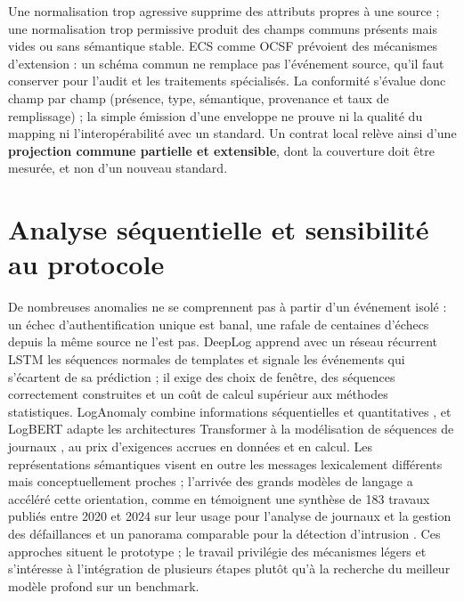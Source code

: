 Une normalisation trop agressive supprime des attributs propres à une source ; une normalisation trop permissive produit des champs communs présents mais vides ou sans sémantique stable. ECS comme OCSF prévoient des mécanismes d'extension : un schéma commun ne remplace pas l'événement source, qu'il faut conserver pour l'audit et les traitements spécialisés. La conformité s'évalue donc champ par champ (présence, type, sémantique, provenance et taux de remplissage) ; la simple émission d'une enveloppe ne prouve ni la qualité du mapping ni l'interopérabilité avec un standard. Un contrat local relève ainsi d'une \textbf{projection commune partielle et extensible}, dont la couverture doit être mesurée, et non d'un nouveau standard.

\section{Analyse séquentielle et sensibilité au protocole}

De nombreuses anomalies ne se comprennent pas à partir d'un événement isolé : un échec d'authentification unique est banal, une rafale de centaines d'échecs depuis la même source ne l'est pas. DeepLog apprend avec un réseau récurrent LSTM les séquences normales de templates et signale les événements qui s'écartent de sa prédiction \cite{du2017deeplog} ; il exige des choix de fenêtre, des séquences correctement construites et un coût de calcul supérieur aux méthodes statistiques. LogAnomaly combine informations séquentielles et quantitatives \cite{meng2019loganomaly}, et LogBERT adapte les architectures Transformer à la modélisation de séquences de journaux \cite{guo2021logbert}, au prix d'exigences accrues en données et en calcul. Les représentations sémantiques visent en outre les messages lexicalement différents mais conceptuellement proches ; l'arrivée des grands modèles de langage a accéléré cette orientation, comme en témoignent une synthèse de 183 travaux publiés entre 2020 et 2024 sur leur usage pour l'analyse de journaux et la gestion des défaillances \cite{zhang2025aiops} et un panorama comparable pour la détection d'intrusion \cite{kheddar2025transformers}. Ces approches situent le prototype ; le travail privilégie des mécanismes légers et s'intéresse à l'intégration de plusieurs étapes plutôt qu'à la recherche du meilleur modèle profond sur un benchmark.

